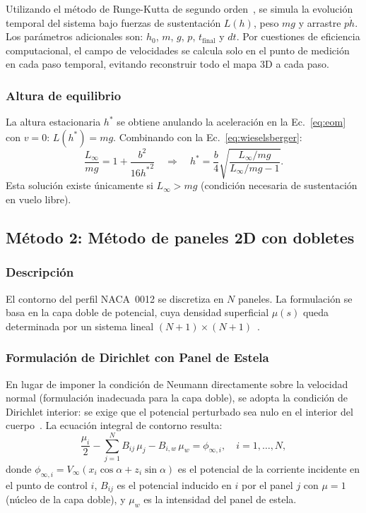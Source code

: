 \documentclass[twocolumn]{article}
\begin{document}
Utilizando el método de Runge-Kutta de segundo orden~\cite{burden2015}, se simula la evolución temporal del sistema bajo fuerzas de sustentación $L(h)$, peso $mg$ y arrastre $ p\dot{h}$. Los parámetros adicionales son: $h_0$, $m$, $g$, $p$, $t_{\text{final}}$ y $dt$. Por cuestiones de eficiencia computacional, el campo de velocidades se calcula solo en el punto de medición en cada paso temporal, evitando reconstruir todo el mapa 3D a cada paso.

\subsubsection{Altura de equilibrio}

La altura estacionaria $h^*$ se obtiene anulando la aceleración en la
Ec.~\eqref{eq:eom} con $v = 0$: $L(h^*) = mg$. Combinando con la
Ec.~\eqref{eq:wieselsberger}:
\begin{equation}
  \frac{L_\infty}{mg} = 1 + \frac{b^2}{16{h^*}^2}
  \quad \Longrightarrow \quad
  h^* = \frac{b}{4}\sqrt{\frac{L_\infty/mg}{L_\infty/mg - 1}}.
  \label{eq:heq}
\end{equation}
Esta solución existe únicamente si $L_\infty > mg$
(condición necesaria de sustentación en vuelo libre).

\subsection{Método 2: Método de paneles 2D con dobletes}

\subsubsection{Descripción}

El contorno del perfil NACA~0012 se discretiza en $N$ paneles.
La formulación se basa en la capa doble de potencial, cuya densidad
superficial $\mu(s)$ queda determinada por un sistema lineal
$(N+1)\times(N+1)$~\cite{hess1967}.

\subsubsection{Formulación de Dirichlet con Panel de Estela}

En lugar de imponer la condición de Neumann directamente sobre la
velocidad normal (formulación inadecuada para la capa doble), se
adopta la condición de Dirichlet interior: se exige que el potencial
perturbado sea nulo en el interior del cuerpo~\cite{katz2001}. La
ecuación integral de contorno resulta:
\begin{equation}
  \frac{\mu_i}{2} - \sum_{j=1}^{N} B_{ij}\,\mu_j
  - B_{i,w}\,\mu_w = \phi_{\infty,i},
  \quad i = 1,\ldots,N,
  \label{eq:dirichlet}
\end{equation}
donde $\phi_{\infty,i} = V_\infty(x_i\cos\alpha + z_i\sin\alpha)$
es el potencial de la corriente incidente en el punto de control $i$,
$B_{ij}$ es el potencial inducido en $i$ por el panel $j$ con
$\mu = 1$ (núcleo de la capa doble), y $\mu_w$ es la intensidad del
panel de estela.
\end{document}
